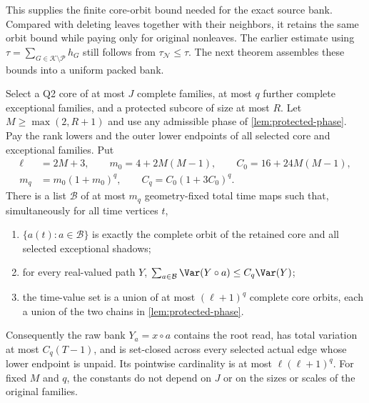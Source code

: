 This supplies the finite core-orbit bound needed for the exact source
bank. Compared with deleting leaves together with their neighbors, it
retains the same orbit bound while paying only for original nonleaves.
The earlier estimate using
$\tau=\sum_{G\in\mathcal K\setminus\mathcal P}h_G$ still follows from
$\tau_{\mathcal N}\le\tau$. The next theorem assembles these bounds into a uniform packed bank.

\begin{theorem}\label{thm:exact-source-bank}
Select a Q2 core of at most $J$ complete families, at most $q$ further
complete exceptional families, and a protected subcore of size at most
$R$. Let $M\ge\max(2,R+1)$ and use any admissible phase of
\cref{lem:protected-phase}. Pay the rank lowers and the outer lower
endpoints of all selected core and exceptional families. Put
\begin{equation}\label{eq:bank-constants}
 \begin{split}
  \ell&=2M+3,\qquad m_0=4+2M(M-1),\qquad C_0=16+24M(M-1),\\
  m_q&=m_0(1+m_0)^q,\qquad C_q=C_0(1+3C_0)^q.
 \end{split}
\end{equation}
There is a list $\mathcal B$ of at most $m_q$ geometry-fixed total time
maps such that, simultaneously for all time vertices $t$,
\begin{enumerate}
\item $\{a(t):a\in\mathcal B\}$ is exactly the complete orbit of the
      retained core and all selected exceptional shadows;
\item for every real-valued path $Y$,
      $\sum_{a\in\mathcal B}\Var(Y\circ a)\le C_q\Var(Y)$;
\item the time-value set is a union of at most $(\ell+1)^q$ complete
      core orbits, each a union of the two chains in
      \cref{lem:protected-phase}.
\end{enumerate}
Consequently the raw bank $Y_a=x\circ a$ contains the root read,
has total variation at most $C_q(T-1)$, and is set-closed across every
selected actual edge whose lower endpoint is unpaid. Its pointwise
cardinality is at most $\ell(\ell+1)^q$. For fixed $M$ and $q$, the
constants do not depend on $J$ or on the sizes or scales of the original
families.
\end{theorem}

